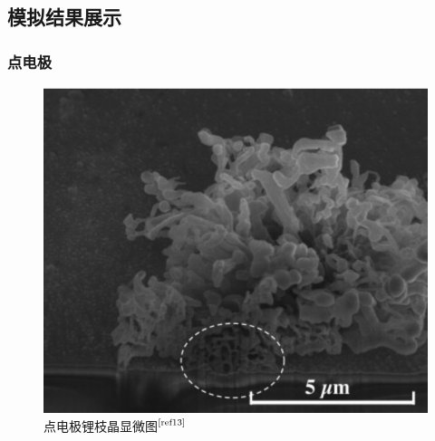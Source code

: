 \documentclass{article}
\begin{document}
\subsection{模拟结果展示}
\subsubsection{点电极}
\begin{figure}[H]
      \centering
       \begin{minipage}{0.32\textwidth}
                    \centering
                    \includegraphics[scale=0.45]{figs/7.png}
                    \caption{点电极锂枝晶显微图$^{\textup{\cite{ref13}}}$}
                   

\end{minipage}
\end{figure}
\end{document}
